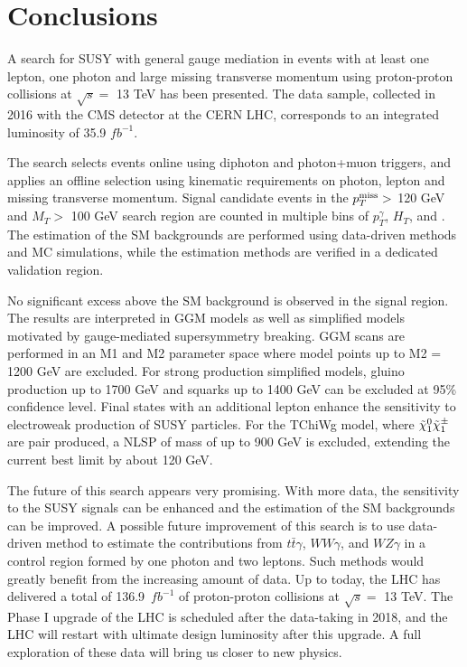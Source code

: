 \documentclass[thesis.tex]{subfiles}
\renewcommand\_{\textunderscore\allowbreak}
\begin{document}
\chapter{Conclusions}
\label{ch8}

A search for SUSY with general gauge mediation in events with at least one lepton, one photon and large missing transverse momentum using proton-proton collisions at $\sqrt{s} = $ 13 TeV has been presented. 
The data sample, collected in 2016 with the CMS detector at the CERN LHC, corresponds to an integrated luminosity of 35.9 $fb^{-1}$. 

The search selects events online using diphoton and photon+muon triggers, and applies an offline selection using kinematic requirements on photon, lepton and missing transverse momentum.  
Signal candidate events in the $p_T^\textrm{miss} > $ 120 GeV and $M_T >$ 100 GeV search region are counted in multiple bins of $p_T^\gamma$, $H_T$, and \MET. 
The estimation of the SM backgrounds are performed using data-driven methods and MC simulations, while the estimation methods are verified in a dedicated validation region. 

No significant excess above the SM background is observed in the signal region.
The results are interpreted in GGM models as well as simplified models motivated by gauge-mediated supersymmetry breaking. 
GGM scans are performed in an M1 and M2 parameter space where model points up to M2 = 1200 GeV are excluded.
For strong production simplified models, gluino production up to 1700 GeV and squarks up to 1400 GeV can be excluded at 95\% confidence level. 
Final states with an additional lepton enhance the sensitivity to electroweak production of SUSY particles. 
For the TChiWg model, where $\tilde{\chi}_1^0\tilde{\chi}_1^\pm$ are pair produced, a NLSP of mass of up to 900 GeV is excluded, extending the current best limit by about 120 GeV. 

The future of this search appears very promising. 
With more data, the sensitivity to the SUSY signals can be enhanced and the estimation of the SM backgrounds can be improved.  
A possible future improvement of this search is to use data-driven method to estimate the contributions from $t\bar{t}\gamma$, $WW\gamma$, and $WZ\gamma$ in a control region formed by one photon and two leptons. 
Such methods would greatly benefit from the increasing amount of data. 
Up to today, the LHC has delivered a total of 136.9~$fb^{-1}$ of proton-proton collisions at $\sqrt{s} = $ 13 TeV. 
The Phase I upgrade of the LHC is scheduled after the data-taking in 2018, and the LHC will restart with ultimate design luminosity after this upgrade.  
A full exploration of these data will bring us closer to new physics.
\end{document}
